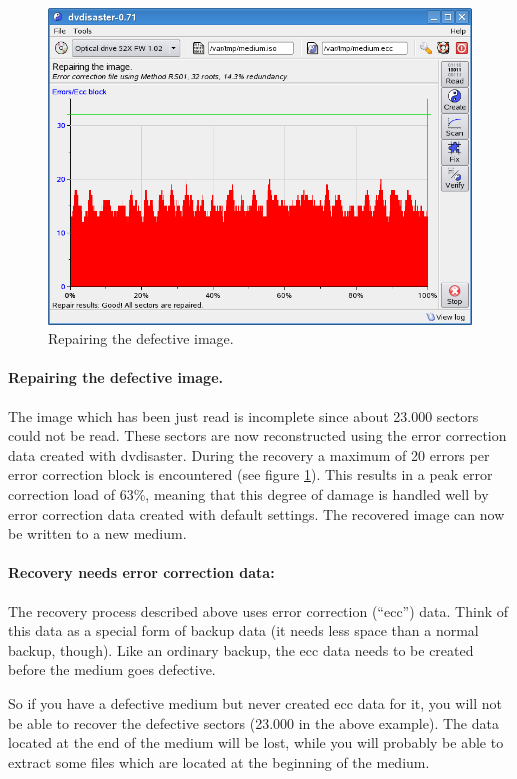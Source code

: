 \begin{figure}[t]
\centerline{\includegraphics[width=\textwidth]{screenshots/fix-image.png}}
\caption{Repairing the defective image.}  
\label{fix-image}
\end{figure}

\paragraph{Repairing the defective image.} 
The image which has been just read is incomplete since about 23.000 sectors could
not be read. These sectors are now reconstructed using the error correction data
created with dvdisaster. During the recovery a maximum of 20 errors per error
correction block is encountered (see figure \ref{fix-image}).
This results in a peak error correction load of
63\%, meaning that this degree of damage is handled well by error correction data
created with default settings. The recovered image can now be written to a new medium.

\paragraph{Recovery needs error correction data:}
The recovery process described above uses error correction (``ecc'') data.
Think of this data as a special form of backup data (it needs less space
than a normal backup, though). Like an ordinary backup, the ecc data needs
to be created before the medium goes defective.

So if you have a defective medium but never created ecc data for it, you will
not be able to recover the defective sectors (23.000 in the above example).
The data located at the end of the medium will be lost, while you will probably
be able to extract some files which are located at the beginning of the medium.
\newpage

